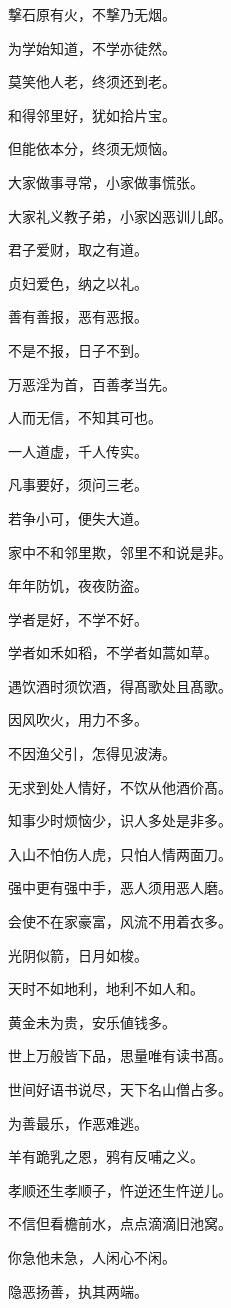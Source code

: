 \documentclass[12pt,oneside]{book}
\begin{document}
撃石原有火，不撃乃无烟。

为学始知道，不学亦徒然。

莫笑他人老，终须还到老。

和得邻里好，犹如拾片宝。

但能依本分，终须无烦恼。

大家做事寻常，小家做事慌张。

大家礼义教子弟，小家凶恶训儿郎。

君子爱财，取之有道。

贞妇爱色，纳之以礼。

善有善报，恶有恶报。

不是不报，日子不到。

万恶淫为首，百善孝当先。

人而无信，不知其可也。

一人道虚，千人传实。

凡事要好，须问三老。

若争小可，便失大道。

家中不和邻里欺，邻里不和说是非。

年年防饥，夜夜防盗。

学者是好，不学不好。

学者如禾如稻，不学者如蒿如草。

遇饮酒时须饮酒，得髙歌处且髙歌。

因风吹火，用力不多。

不因渔父引，怎得见波涛。

无求到处人情好，不饮从他酒价髙。

知事少时烦恼少，识人多处是非多。

入山不怕伤人虎，只怕人情两面刀。

强中更有强中手，恶人须用恶人磨。

会使不在家豪富，风流不用着衣多。

光阴似箭，日月如梭。

天时不如地利，地利不如人和。

黄金未为贵，安乐値钱多。

世上万般皆下品，思量唯有读书髙。

世间好语书说尽，天下名山僧占多。

为善最乐，作恶难逃。

羊有跪乳之恩，鸦有反哺之义。

孝顺还生孝顺子，忤逆还生忤逆儿。

不信但看檐前水，点点滴滴旧池窝。

你急他未急，人闲心不闲。

隐恶扬善，执其两端。
\end{document}

